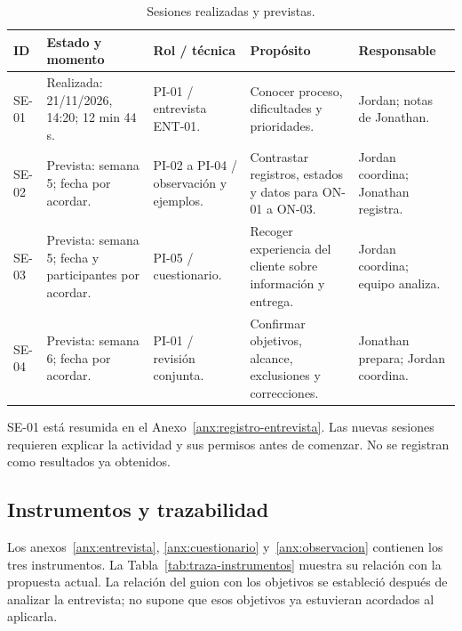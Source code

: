 \begin{table}[H]\centering\small
\caption{Sesiones realizadas y previstas.}\label{tab:sesiones}
\noindent\begin{tabularx}{\linewidth}{@{}L{1cm}L{2.9cm}L{2.7cm}YL{2.5cm}@{}}
\toprule
\textbf{ID} & \textbf{Estado y momento} & \textbf{Rol / técnica} & \textbf{Propósito} & \textbf{Responsable} \\
\midrule
SE-01 & Realizada: 21/11/2026, 14:20; 12 min 44 s. & PI-01 / entrevista ENT-01. & Conocer proceso, dificultades y prioridades. & Jordan; notas de Jonathan. \\
SE-02 & Prevista: semana 5; fecha por acordar. & PI-02 a PI-04 / observación y ejemplos. & Contrastar registros, estados y datos para ON-01 a ON-03. & Jordan coordina; Jonathan registra. \\
SE-03 & Prevista: semana 5; fecha y participantes por acordar. & PI-05 / cuestionario. & Recoger experiencia del cliente sobre información y entrega. & Jordan coordina; equipo analiza. \\
SE-04 & Prevista: semana 6; fecha por acordar. & PI-01 / revisión conjunta. & Confirmar objetivos, alcance, exclusiones y correcciones. & Jonathan prepara; Jordan coordina. \\
\bottomrule
\end{tabularx}
\end{table}

SE-01 está resumida en el Anexo~\ref{anx:registro-entrevista}. Las nuevas sesiones requieren
explicar la actividad y sus permisos antes de comenzar. No se registran como resultados ya obtenidos.

\subsection{Instrumentos y trazabilidad}
Los anexos~\ref{anx:entrevista}, \ref{anx:cuestionario} y~\ref{anx:observacion} contienen los tres
instrumentos. La Tabla~\ref{tab:traza-instrumentos} muestra su relación con la propuesta actual.
La relación del guion con los objetivos se estableció después de analizar la entrevista; no
supone que esos objetivos ya estuvieran acordados al aplicarla.

